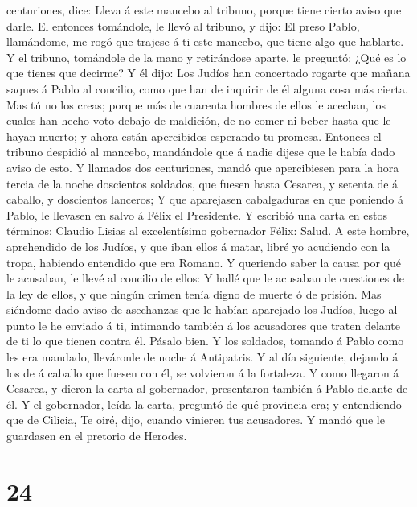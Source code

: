 centuriones, dice: Lleva á este mancebo al tribuno, porque tiene cierto
aviso que darle.  El entonces tomándole, le llevó al
tribuno, y dijo: El preso Pablo, llamándome, me rogó que trajese á ti
este mancebo, que tiene algo que hablarte.  Y el tribuno,
tomándole de la mano y retirándose aparte, le preguntó: ¿Qué es lo que
tienes que decirme?  Y él dijo: Los Judíos han concertado
rogarte que mañana saques á Pablo al concilio, como que han de inquirir
de él alguna cosa más cierta.  Mas tú no los creas;
porque más de cuarenta hombres de ellos le acechan, los cuales han hecho
voto debajo de maldición, de no comer ni beber hasta que le hayan
muerto; y ahora están apercibidos esperando tu promesa. 
Entonces el tribuno despidió al mancebo, mandándole que á nadie dijese
que le había dado aviso de esto.  Y llamados dos
centuriones, mandó que apercibiesen para la hora tercia de la noche
doscientos soldados, que fuesen hasta Cesarea, y setenta de á caballo, y
doscientos lanceros;  Y que aparejasen cabalgaduras en
que poniendo á Pablo, le llevasen en salvo á Félix el Presidente.
 Y escribió una carta en estos términos: 
Claudio Lisias al excelentísimo gobernador Félix: Salud. 
A este hombre, aprehendido de los Judíos, y que iban ellos á matar,
libré yo acudiendo con la tropa, habiendo entendido que era Romano.
 Y queriendo saber la causa por qué le acusaban, le llevé
al concilio de ellos:  Y hallé que le acusaban de
cuestiones de la ley de ellos, y que ningún crimen tenía digno de muerte
ó de prisión.  Mas siéndome dado aviso de asechanzas que
le habían aparejado los Judíos, luego al punto le he enviado á ti,
intimando también á los acusadores que traten delante de ti lo que
tienen contra él. Pásalo bien.  Y los soldados, tomando á
Pablo como les era mandado, lleváronle de noche á Antipatris.
 Y al día siguiente, dejando á los de á caballo que
fuesen con él, se volvieron á la fortaleza.  Y como
llegaron á Cesarea, y dieron la carta al gobernador, presentaron también
á Pablo delante de él.  Y el gobernador, leída la carta,
preguntó de qué provincia era; y entendiendo que de Cilicia,
 Te oiré, dijo, cuando vinieren tus acusadores. Y mandó
que le guardasen en el pretorio de Herodes.

\hypertarget{section-23}{%
\section{24}\label{section-23}}

